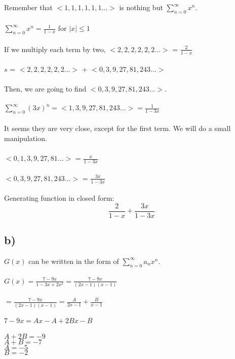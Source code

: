 \documentclass[12pt]{article}
\begin{document}
Remember that $<1,1,1,1,1,1...>$ is nothing but $\sum_{n=0}^{\infty}x^n$.\\\\

$\sum_{n=0}^{\infty}x^n = \frac{1}{1-x}$ for $|x| \leq 1$\\\\

If we multiply each term by two, $<2,2,2,2,2,2...>$ = $\frac{2}{1-x}$\\\\

$s$ = $<2,2,2,2,2,2...>$ + $<0,3,9,27,81,243...>$\\\\

Then, we are going to find $<0,3,9,27,81,243...>$.\\\\

$\sum_{n=0}^{\infty}(3x)^n = <1,3,9,27,81,243...> = \frac{1}{1-3x}$\\\\


It seems they are very close, except for the first term. We will do a small manipulation.\\\\

$<0,1,3,9,27,81...>$ = $\frac{x}{1-3x}$\\\\

$<0,3,9,27,81,243...>$ = $\frac{3x}{1-3x}$\\\\

Generating function in closed form: $$\frac{2}{1-x} + \frac{3x}{1-3x}$$

\subsection*{b) }
$G(x)$ can be written in the form of $\sum_{n=0}^{\infty} a_n x^n$.\\\\
$G(x) = \frac{7-9x}{1-3x+2x^2} = \frac{7-9x}{(2x-1)(x-1)}$\\\\

$= \frac{7-9x}{(2x-1)(x-1)} = \frac{A}{2x-1} + \frac{B}{x-1}$\\\\

$7-9x = Ax - A +2Bx - B$\\\\
$A+2B = -9$\\
$A+B = -7$\\
$A = -5$\\
$B = -2$\\
\end{document}
